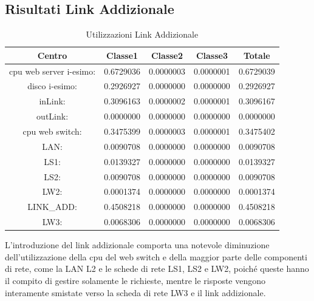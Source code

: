 \subsection{Risultati Link Addizionale}
\begin{table}[H]
\begin{center}
\begin{tabular}{||c|c|c|c|c||}
\hline
Centro &Classe1 &Classe2 &Classe3 &Totale\\
\hline
\hline
 cpu web server i-esimo: 	&0.6729036	&0.0000003	&0.0000001	&0.6729039\\
\hline
 disco i-esimo: 	&0.2926927	&0.0000000	&0.0000000	&0.2926927\\
\hline
 inLink: 	&0.3096163	&0.0000002	&0.0000001	&0.3096167\\
\hline
 outLink: 	&0.0000000	&0.0000000	&0.0000000	&0.0000000\\
\hline
 cpu web switch: 	&0.3475399	&0.0000003	&0.0000001	&0.3475402\\
\hline
 LAN: 	&0.0090708	&0.0000000	&0.0000000	&0.0090708\\
\hline
 LS1: 	&0.0139327	&0.0000000	&0.0000000	&0.0139327\\
\hline
 LS2:	&0.0090708	&0.0000000	&0.0000000	&0.0090708\\
\hline
 LW2: 	&0.0001374	&0.0000000	&0.0000000	&0.0001374\\
\hline
 LINK\_ADD: 	&0.4508218	&0.0000000	&0.0000000	&0.4508218\\
\hline
 LW3: 	&0.0068306	&0.0000000	&0.0000000	&0.0068306\\
\hline
\end{tabular}
\end{center}
\caption{Utilizzazioni Link Addizionale}
\label{utilizzazioni}
\end{table}
L'introduzione del link addizionale comporta una notevole diminuzione dell'utilizzazione della cpu del web switch e  della maggior parte delle componenti di rete, come la LAN L2 e le schede di rete LS1, LS2 e LW2, poiché queste hanno il compito di gestire solamente le richieste, mentre le risposte  vengono interamente smistate verso la scheda di rete LW3 e il link addizionale.
